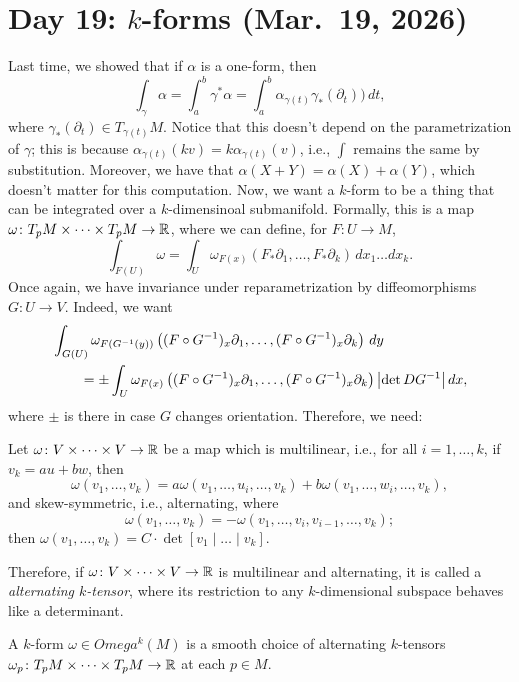 \section{Day 19: \texorpdfstring{$k$}{k}-forms (Mar.\ 19, 2026)}
Last time, we showed that if $\alpha$ is a one-form, then
\[ \int_\gamma \alpha = \int_a^b \gamma^\ast \alpha = \int_a^b \alpha_{\gamma(t)} \gamma_\ast(\partial_t)) \, dt, \]
where $\gamma_\ast(\partial_t) \in T_{\gamma(t)} M$. Notice that this doesn't depend on the parametrization of $\gamma$; this is because $\alpha_{\gamma(t)} (kv) = k \alpha_{\gamma(t)} (v)$, i.e., $\int$ remains the same by substitution. Moreover, we have that $\alpha(X + Y) = \alpha(X) + \alpha(Y)$, which doesn't matter for this computation. Now, we want a $k$-form to be a thing that can be integrated over a $k$-dimensinoal submanifold. Formally, this is a map $\omega \colon T_p M \times \dots \times T_p M \to \mathbb R$, where we can define, for $F \colon U \to M$,
\[ \int_{F(U)} \omega = \int_U \omega_{F(x)} (F_\ast \partial_1, \dots, F_\ast \partial_k) \, dx_1 \dots dx_k. \]
Once again, we have invariance under reparametrization by diffeomorphisms $G \colon U \to V$. Indeed, we want
\begin{align*} 
    &\int_{G(U)} \omega_{F(G^{-1}(y))} \left((F \circ G^{-1})_x \partial_1, \dots, (F \circ G^{-1})_x \partial_k\right) \, dy \\
    & \qquad = \pm \int_U \omega_{F(x)} \left((F \circ G^{-1})_x \partial_1, \dots, (F \circ G^{-1})_x \partial_k\right) \left\lvert \det DG^{-1} \right\rvert dx,
\end{align*}
where $\pm$ is there in case $G$ changes orientation. Therefore, we need:
\begin{fact}
    Let $\omega \colon V \times \dots \times V \to \mathbb R$ be a map which is multilinear, i.e., for all $i = 1, \dots, k$, if $v_k = a u + bw$, then
    \[ \omega(v_1, \dots, v_k) = a \omega(v_1, \dots, u_i, \dots, v_k) + b \omega(v_1, \dots, w_i, \dots, v_k), \]
    and skew-symmetric, i.e., alternating, where
    \[ \omega(v_1, \dots, v_k) = -\omega(v_1, \dots, v_i, v_{i-1}, \dots, v_k); \]
    then $\omega(v_1, \dots, v_k) = C \cdot \det[v_1 \mid \dots \mid v_k]$.
\end{fact}
Therefore, if $\omega \colon V \times \dots \times V \to \mathbb R$ is multilinear and alternating, it is called a \textit{alternating $k$-tensor}, where its restriction to any $k$-dimensional subspace behaves like a determinant.
\begin{definition}[Vague]
    A $k$-form $\omega \in Omega^k(M)$ is a smooth choice of alternating $k$-tensors $\omega_p \colon T_p M \times \dots \times T_p M \to \mathbb R$ at each $p \in M$.
\end{definition}
